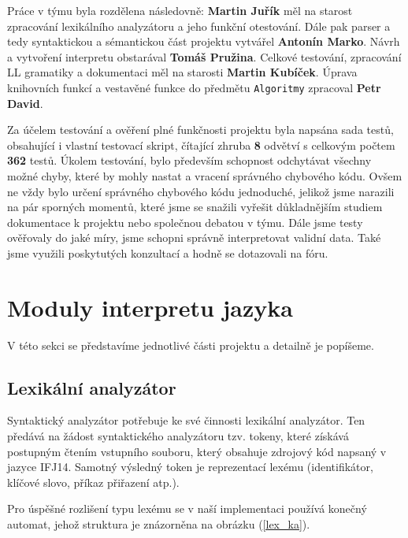 \documentclass[12pt,a4paper,titlepage,final]{article}
\begin{document}
Práce v týmu byla rozdělena následovně: \textbf{Martin Juřík} měl na starost zpracování lexikálního analyzátoru a jeho funkční otestování. Dále pak parser a tedy syntaktickou a sémantickou část projektu vytvářel \textbf{Antonín Marko}. Návrh a vytvoření interpretu obstarával \textbf{Tomáš Pružina}. Celkové testování, zpracování LL gramatiky a dokumentaci měl na starosti \textbf{Martin Kubíček}. Úprava knihovních funkcí a vestavěné funkce do předmětu \verb|Algoritmy| zpracoval \textbf{Petr David}.

Za účelem testování a ověření plné funkčnosti projektu byla napsána sada testů, obsahující i vlastní testovací skript, čítající zhruba \textbf{8} odvětví s celkovým počtem \textbf{362} testů. Úkolem testování, bylo především schopnost odchytávat všechny možné chyby, které by mohly nastat a vracení správného chybového kódu. Ovšem ne vždy bylo určení správného chybového kódu jednoduché, jelikož jsme narazili na pár sporných momentů, které jsme se snažili vyřešit důkladnějším studiem dokumentace k projektu nebo společnou debatou v týmu. Dále jsme testy ověřovaly do jaké míry, jsme schopni správně interpretovat validní data. Také jsme využili poskytutých konzultací a hodně se dotazovali na fóru.

\section{Moduly interpretu jazyka} \label{moduly_interpretu}

V této sekci se představíme jednotlivé části projektu a detailně je popíšeme.
\subsection{Lexikální analyzátor} \label{lexikalni_analyzator}

Syntaktický analyzátor potřebuje ke své činnosti lexikální analyzátor. Ten
předává na žádost syntaktického analyzátoru tzv. tokeny, které získává postupným
čtením vstupního souboru, který obsahuje zdrojový kód napsaný v jazyce IFJ14.
Samotný výsledný token je reprezentací lexému (identifikátor, klíčové slovo,
příkaz přiřazení atp.).

Pro úspěšné rozlišení typu lexému se v naší implementaci používá konečný
automat, jehož struktura je znázorněna na obrázku (\ref{lex_ka}).
\end{document}
